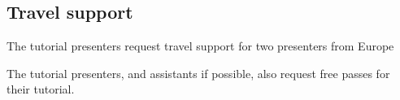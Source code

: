 \subsection*{Travel support}
The tutorial presenters request travel support for two presenters from Europe

The tutorial presenters, and assistants if possible, also request free passes for their tutorial.
